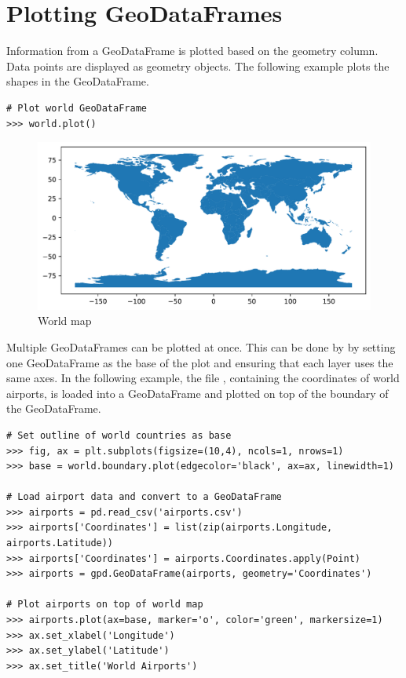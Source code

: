 \section*{Plotting GeoDataFrames} %

Information from a GeoDataFrame is plotted based on the geometry column.
Data points are displayed as geometry objects.
The following example plots the shapes in the  GeoDataFrame.

\begin{lstlisting}
# Plot world GeoDataFrame
>>> world.plot()
\end{lstlisting}

\begin{figure}[H]
\begin{center}
\includegraphics[scale=.7]{figures/worldmap.pdf}
\end{center}
\label{world-map}
\caption{World map}
\end{figure}

Multiple GeoDataFrames can be plotted at once.
This can be done by by setting one GeoDataFrame as the base of the plot and ensuring that each layer uses the same axes.
In the following example, the file , containing the coordinates of world airports, is loaded into a GeoDataFrame and plotted on top of the boundary of the  GeoDataFrame.

\begin{lstlisting}
# Set outline of world countries as base
>>> fig, ax = plt.subplots(figsize=(10,4), ncols=1, nrows=1)
>>> base = world.boundary.plot(edgecolor='black', ax=ax, linewidth=1)

# Load airport data and convert to a GeoDataFrame
>>> airports = pd.read_csv('airports.csv')
>>> airports['Coordinates'] = list(zip(airports.Longitude, airports.Latitude))
>>> airports['Coordinates'] = airports.Coordinates.apply(Point)
>>> airports = gpd.GeoDataFrame(airports, geometry='Coordinates')

# Plot airports on top of world map
>>> airports.plot(ax=base, marker='o', color='green', markersize=1)
>>> ax.set_xlabel('Longitude')
>>> ax.set_ylabel('Latitude')
>>> ax.set_title('World Airports')
\end{lstlisting}

